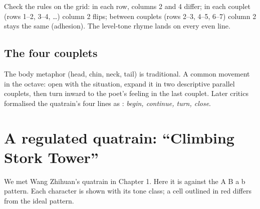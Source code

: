 Check the rules on the grid: in each row, columns 2 and 4 differ; in each couplet (rows
1--2, 3--4, \ldots) column 2 flips; between couplets (rows 2--3, 4--5, 6--7) column 2 stays
the same (adhesion). The level-tone rhyme lands on every even line.

\subsection{The four couplets}

\begin{center}
\end{center}

\begin{aside}
The body metaphor (head, chin, neck, tail) is traditional. A common movement in the
octave: open with the situation, expand it in two descriptive parallel couplets, then turn
inward to the poet's feeling in the last couplet. Later critics formalised the quatrain's
four lines as : \emph{begin, continue, turn, close}.
\end{aside}

\section{A regulated quatrain: ``Climbing Stork Tower''}

We met Wang Zhihuan's quatrain in Chapter 1. Here it is against the A B a b pattern.
Each character is shown with its tone class; a cell outlined in red differs from the ideal
pattern.

